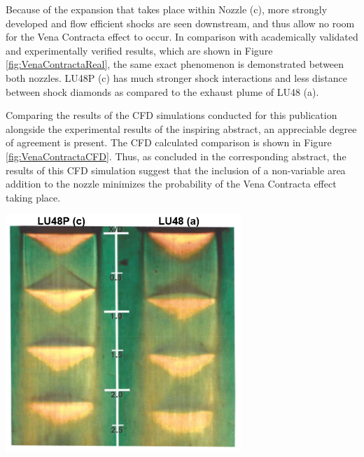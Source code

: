 \documentclass[12pt]{article} %
\begin{document}
Because of the expansion that takes place within Nozzle (c), more strongly developed and flow efficient shocks are seen downstream, and thus allow no room for the Vena Contracta effect to occur. In comparison with academically validated and experimentally verified results, which are shown in Figure \ref{fig:VenaContractaReal}, the same exact phenomenon is demonstrated between both nozzles. LU48P (c) has much stronger shock interactions and less distance between shock diamonds as compared to the exhaust plume of LU48 (a).\par
Comparing the results of the CFD simulations conducted for this publication alongside the experimental results of the inspiring abstract, an appreciable degree of agreement is present. The CFD calculated comparison is shown in Figure \ref{fig:VenaContractaCFD}. Thus, as concluded in the corresponding abstract, the results of this CFD simulation suggest that the inclusion of a non-variable area addition to the nozzle minimizes the probability of the Vena Contracta effect taking place.

\begin{center}
    \includegraphics[width=3.5in]{VenaContracta_Real.PNG}
    \label{fig:VenaContractaReal}
\end{center}
\end{document}
